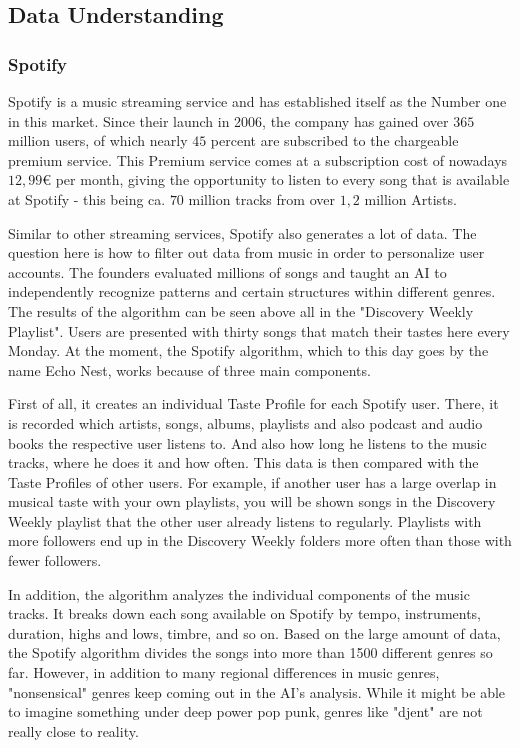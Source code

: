 \subsection{Data Understanding}

\subsubsection{Spotify}
Spotify is a music streaming service and has established itself as the Number one in this market. 
Since their launch in 2006, the company has gained over \(365\) million users, of which nearly \(45\) percent
are subscribed to the chargeable premium service. 
This Premium service comes at a subscription cost of nowadays \(12,99\)€ per month,
giving the opportunity to listen to every song that is available at Spotify - this being
ca. \(70\) million tracks from over \(1,2\) million Artists. \cite[]{L.Rabe2021}

Similar to other streaming services, Spotify also generates a lot of data.
The question here is how to filter out data from music in order to personalize user accounts. 
The founders evaluated millions of songs and taught an AI to independently recognize
patterns and certain structures within different genres. 
The results of the algorithm can be seen above all in the "Discovery Weekly Playlist". 
Users are presented with thirty songs that match their tastes here every Monday.
At the moment, the Spotify algorithm, which to this day goes by the name Echo Nest,
works because of three main components. \cite[]{Stephenson2021}

First of all, it creates an individual Taste Profile for each Spotify user. 
There, it is recorded which artists, songs, albums, playlists and also podcast and audio books the
respective user listens to. 
And also how long he listens to the music tracks, where he does it and how often.
This data is then compared with the Taste Profiles of other users. 
For example, if another user has a large overlap in musical taste with your own playlists,
you will be shown songs in the Discovery Weekly playlist that the other user already listens to regularly.
Playlists with more followers end up in the Discovery Weekly folders more often than those with
fewer followers. \cite[]{Stephenson2021}

In addition, the algorithm analyzes the individual components of the music tracks. 
It breaks down each song available on Spotify by tempo, instruments, duration, highs and lows,
timbre, and so on. 
Based on the large amount of data, the Spotify algorithm divides the songs into more than 1500
different genres so far. 
However, in addition to many regional differences in music genres, "nonsensical" genres keep
coming out in the AI's analysis. While it might be able to imagine something under deep power pop punk,
genres like "djent" are not really close to reality. \cite[]{Boyd2019}

